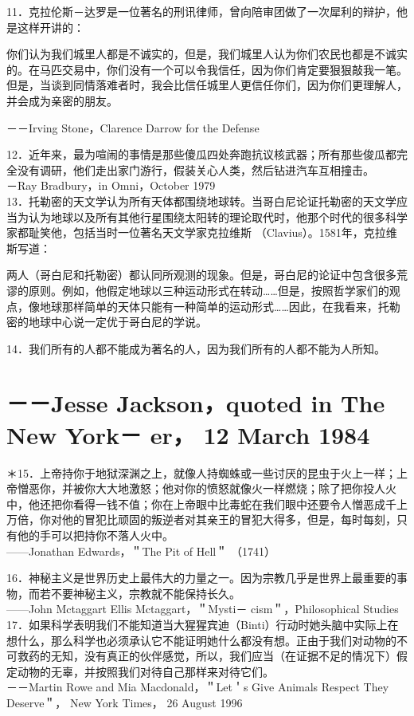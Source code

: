 11．克拉伦斯－达罗是一位著名的刑讯律师，曾向陪审团做了一次犀利的辩护，他是这样开讲的：

\begin{displayquote}
你们认为我们城里人都是不诚实的，但是，我们城里人认为你们农民也都是不诚实的。在马匹交易中，你们没有一个可以令我信任，因为你们肯定要狠狠敲我一笔。但是，当谈到同情落难者时，我会比信任城里人更信任你们，因为你们更理解人，并会成为亲密的朋友。
\end{displayquote}

－－Irving Stone，Clarence Darrow for the Defense

12．近年来，最为喧闹的事情是那些傻瓜四处奔跑抗议核武器；所有那些俊瓜都完全没有调研，他们走出家门游行，假装关心人类，然后钻进汽车互相撞击。\\
－Ray Bradbury，in Omni，October 1979\\
13．托勒密的天文学认为所有天体都围绕地球转。当哥白尼论证托勒密的天文学应当为认为地球以及所有其他行星围绕太阳转的理论取代时，他那个时代的很多科学家都耻笑他，包括当时一位著名天文学家克拉维斯 （Clavius）。1581年，克拉维斯写道：

两人（哥白尼和托勒密）都认同所观测的现象。但是，哥白尼的论证中包含很多荒谬的原则。例如，他假定地球以三种运动形式在转动……但是，按照哲学家们的观点，像地球那样简单的天体只能有一种简单的运动形式……因此，在我看来，托勒密的地球中心说一定优于哥白尼的学说。

14．我们所有的人都不能成为著名的人，因为我们所有的人都不能为人所知。

\section*{－－Jesse Jackson，quoted in The New York－ er， 12 March 1984}
＊15．上帝持你于地狱深渊之上，就像人持蜘蛛或一些讨厌的昆虫于火上一样；上帝憎恶你，并被你大大地激怒；他对你的愤怒就像火一样燃烧；除了把你投人火中，他还把你看得一钱不值；你在上帝眼中比毒蛇在我们眼中还要令人憎恶成千上万倍，你对他的冒犯比顽固的叛逆者对其亲王的冒犯大得多，但是，每时每刻，只有他的手可以把持你不落人火中。\\
——Jonathan Edwards，＂The Pit of Hell＂ （1741）

16．神秘主义是世界历史上最伟大的力量之一。因为宗教几乎是世界上最重要的事物，而若不要神秘主义，宗教就不能保持长久。\\
——John Mctaggart Ellis Mctaggart，＂Mysti－ cism＂，Philosophical Studies\\
17．如果科学表明我们不能知道当大猩猩宾迪（Binti）行动时她头脑中实际上在想什么，那么科学也必须承认它不能证明她什么都没有想。正由于我们对动物的不可救药的无知，没有真正的伙伴感觉，所以，我们应当（在证据不足的情况下）假定动物的无辜，并按照我们对待自己那样来对待它们。\\
－－Martin Rowe and Mia Macdonald，＂Let＇s Give Animals Respect They Deserve＂， New York Times， 26 August 1996

